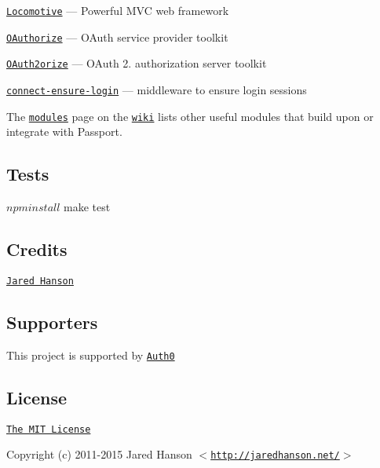 \begin{DoxyItemize}
\item \href{https://github.com/jaredhanson/locomotive}{\tt Locomotive} — Powerful M\+VC web framework
\item \href{https://github.com/jaredhanson/oauthorize}{\tt O\+Authorize} — O\+Auth service provider toolkit
\item \href{https://github.com/jaredhanson/oauth2orize}{\tt O\+Auth2orize} — O\+Auth 2. authorization server toolkit
\item \href{https://github.com/jaredhanson/connect-ensure-login}{\tt connect-\/ensure-\/login} — middleware to ensure login sessions
\end{DoxyItemize}

The \href{https://github.com/jaredhanson/passport/wiki/Modules}{\tt modules} page on the \href{https://github.com/jaredhanson/passport/wiki}{\tt wiki} lists other useful modules that build upon or integrate with Passport.

\subsection*{Tests}


\begin{DoxyCode}
$ npm install
$ make test
\end{DoxyCode}


\subsection*{Credits}


\begin{DoxyItemize}
\item \href{http://github.com/jaredhanson}{\tt Jared Hanson}
\end{DoxyItemize}

\subsection*{Supporters}

This project is supported by  \href{https://auth0.com}{\tt Auth0}

\subsection*{License}

\href{http://opensource.org/licenses/MIT}{\tt The M\+IT License}

Copyright (c) 2011-\/2015 Jared Hanson $<$\href{http://jaredhanson.net/}{\tt http\+://jaredhanson.\+net/}$>$ 